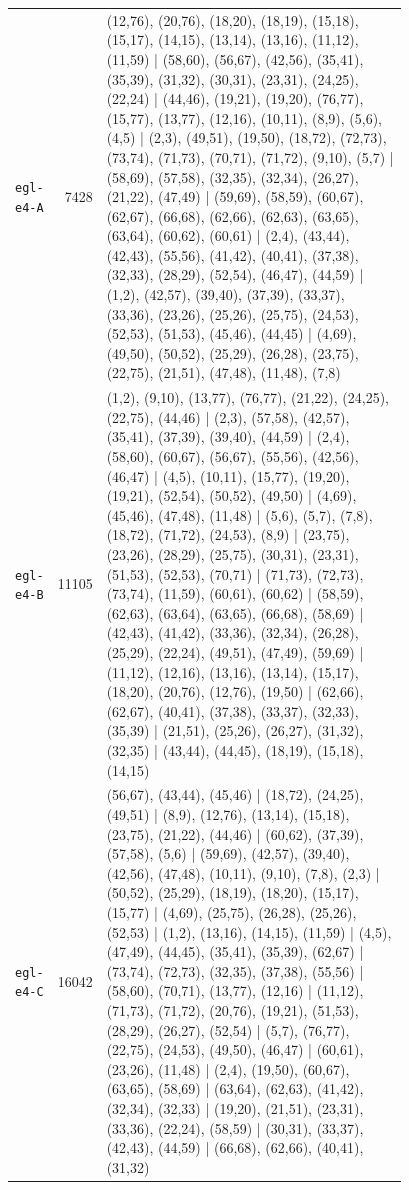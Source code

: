 \begin{landscape}
\begin{longtable}{lr>{\tiny\raggedright\arraybackslash}p{0.78\linewidth}}
\texttt{egl-e4-A} & 7428 & (12,76), (20,76), (18,20), (18,19), (15,18), (15,17), (14,15), (13,14), (13,16), (11,12), (11,59) | (58,60), (56,67), (42,56), (35,41), (35,39), (31,32), (30,31), (23,31), (24,25), (22,24) | (44,46), (19,21), (19,20), (76,77), (15,77), (13,77), (12,16), (10,11), (8,9), (5,6), (4,5) | (2,3), (49,51), (19,50), (18,72), (72,73), (73,74), (71,73), (70,71), (71,72), (9,10), (5,7) | (58,69), (57,58), (32,35), (32,34), (26,27), (21,22), (47,49) | (59,69), (58,59), (60,67), (62,67), (66,68), (62,66), (62,63), (63,65), (63,64), (60,62), (60,61) | (2,4), (43,44), (42,43), (55,56), (41,42), (40,41), (37,38), (32,33), (28,29), (52,54), (46,47), (44,59) | (1,2), (42,57), (39,40), (37,39), (33,37), (33,36), (23,26), (25,26), (25,75), (24,53), (52,53), (51,53), (45,46), (44,45) | (4,69), (49,50), (50,52), (25,29), (26,28), (23,75), (22,75), (21,51), (47,48), (11,48), (7,8) \\[2pt]
\texttt{egl-e4-B} & 11105 & (1,2), (9,10), (13,77), (76,77), (21,22), (24,25), (22,75), (44,46) | (2,3), (57,58), (42,57), (35,41), (37,39), (39,40), (44,59) | (2,4), (58,60), (60,67), (56,67), (55,56), (42,56), (46,47) | (4,5), (10,11), (15,77), (19,20), (19,21), (52,54), (50,52), (49,50) | (4,69), (45,46), (47,48), (11,48) | (5,6), (5,7), (7,8), (18,72), (71,72), (24,53), (8,9) | (23,75), (23,26), (28,29), (25,75), (30,31), (23,31), (51,53), (52,53), (70,71) | (71,73), (72,73), (73,74), (11,59), (60,61), (60,62) | (58,59), (62,63), (63,64), (63,65), (66,68), (58,69) | (42,43), (41,42), (33,36), (32,34), (26,28), (25,29), (22,24), (49,51), (47,49), (59,69) | (11,12), (12,16), (13,16), (13,14), (15,17), (18,20), (20,76), (12,76), (19,50) | (62,66), (62,67), (40,41), (37,38), (33,37), (32,33), (35,39) | (21,51), (25,26), (26,27), (31,32), (32,35) | (43,44), (44,45), (18,19), (15,18), (14,15) \\[2pt]
\texttt{egl-e4-C} & 16042 & (56,67), (43,44), (45,46) | (18,72), (24,25), (49,51) | (8,9), (12,76), (13,14), (15,18), (23,75), (21,22), (44,46) | (60,62), (37,39), (57,58), (5,6) | (59,69), (42,57), (39,40), (42,56), (47,48), (10,11), (9,10), (7,8), (2,3) | (50,52), (25,29), (18,19), (18,20), (15,17), (15,77) | (4,69), (25,75), (26,28), (25,26), (52,53) | (1,2), (13,16), (14,15), (11,59) | (4,5), (47,49), (44,45), (35,41), (35,39), (62,67) | (73,74), (72,73), (32,35), (37,38), (55,56) | (58,60), (70,71), (13,77), (12,16) | (11,12), (71,73), (71,72), (20,76), (19,21), (51,53), (28,29), (26,27), (52,54) | (5,7), (76,77), (22,75), (24,53), (49,50), (46,47) | (60,61), (23,26), (11,48) | (2,4), (19,50), (60,67), (63,65), (58,69) | (63,64), (62,63), (41,42), (32,34), (32,33) | (19,20), (21,51), (23,31), (33,36), (22,24), (58,59) | (30,31), (33,37), (42,43), (44,59) | (66,68), (62,66), (40,41), (31,32) \\[2pt]

\end{longtable}
\end{landscape}
